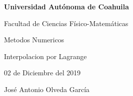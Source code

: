 \documentclass{article}
\begin{document}
\begin{center}
{\Large \textbf{Universidad Autónoma de Coahuila}}
\end{center}

\begin{center}
{\large Facultad de Ciencias Físico-Matemáticas}
\end{center}

\begin{center}
{\large Metodos Numericos}
\end{center}

\begin{center}
{\large Interpolacion por Lagrange}
\end{center}

\begin{center}
{\large 02 de Diciembre del 2019}
\end{center}

\begin{center}
{\large José Antonio Olveda García}
\end{center}

\vspace{5mm}
\end{document}
